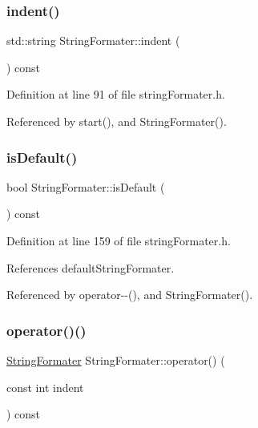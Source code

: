 \subsubsection{\texorpdfstring{indent()}{indent()}}
{\footnotesize\ttfamily std\+::string String\+Formater\+::indent (\begin{DoxyParamCaption}{ }\end{DoxyParamCaption}) const\hspace{0.3cm}{\ttfamily [inline]}}



Definition at line 91 of file string\+Formater.\+h.



Referenced by start(), and String\+Formater().

\mbox{\label{classStringFormater_ac16a9d38ab08c90faf1f0d3e2c2a648d}} 
\subsubsection{\texorpdfstring{is\+Default()}{isDefault()}}
{\footnotesize\ttfamily bool String\+Formater\+::is\+Default (\begin{DoxyParamCaption}{ }\end{DoxyParamCaption}) const}



Definition at line 159 of file string\+Formater.\+h.



References default\+String\+Formater.



Referenced by operator-\/-\/(), and String\+Formater().

\mbox{\label{classStringFormater_a0fe6b7b48c1660c4a009da745c05451c}} 
\subsubsection{\texorpdfstring{operator()()}{operator()()}}
{\footnotesize\ttfamily \hyperlink{classStringFormater}{String\+Formater} String\+Formater\+::operator() (\begin{DoxyParamCaption}\item[{const int}]{indent }\end{DoxyParamCaption}) const\hspace{0.3cm}{\ttfamily [inline]}}




